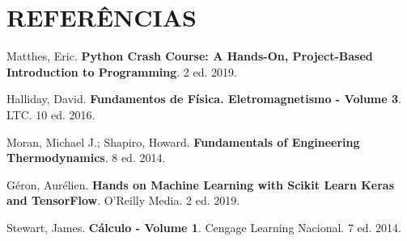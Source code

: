 \chapter{REFERÊNCIAS}

Matthes, Eric. \textbf{Python Crash Course: A Hands-On, Project-Based Introduction to Programming}. 2 ed. 2019.

Halliday, David. \textbf{Fundamentos de Física. Eletromagnetismo - Volume 3}. LTC. 10 ed. 2016.

Moran, Michael J.; Shapiro, Howard. \textbf{Fundamentals of Engineering Thermodynamics}. 8 ed. 2014.

Géron, Aurélien. \textbf{Hands on Machine Learning with Scikit Learn Keras and TensorFlow}. O’Reilly Media. 2 ed. 2019. 

Stewart, James. \textbf{Cálculo - Volume 1}. Cengage Learning Nacional. 7 ed. 2014.


